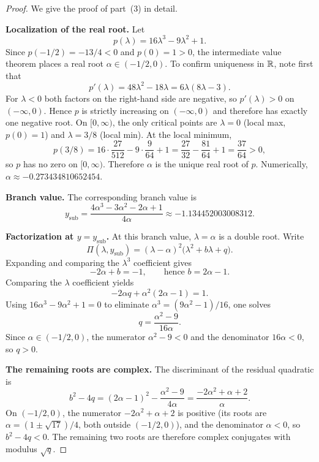 \begin{proof}
We give the proof of part~(3) in detail.

\medskip
\noindent\textbf{Localization of the real root.}
Let
\begin{equation}\label{eq:cubic-lambda}
p(\lambda) = 16\lambda^3 - 9\lambda^2 + 1.
\end{equation}
Since $p(-1/2) = -13/4 < 0$ and $p(0) = 1 > 0$, the intermediate value theorem places a real root $\alpha \in (-1/2, 0)$.
To confirm uniqueness in $\mathbb{R}$, note first that
\[
p'(\lambda) = 48\lambda^2 - 18\lambda = 6\lambda(8\lambda - 3).
\]
For $\lambda < 0$ both factors on the right-hand side are negative, so $p'(\lambda) > 0$ on $(-\infty,0)$.
Hence $p$ is strictly increasing on $(-\infty,0)$ and therefore has exactly one negative root.
On $[0,\infty)$, the only critical points are $\lambda = 0$ (local max, $p(0) = 1$) and $\lambda = 3/8$ (local min).
At the local minimum,
\[
p(3/8) = 16 \cdot \frac{27}{512} - 9 \cdot \frac{9}{64} + 1
= \frac{27}{32} - \frac{81}{64} + 1 = \frac{37}{64} > 0,
\]
so $p$ has no zero on $[0,\infty)$.
Therefore $\alpha$ is the unique real root of $p$.
Numerically, $\alpha \approx -0.273434810652454$.

\medskip
\noindent\textbf{Branch value.}
The corresponding branch value is
\begin{equation}\label{eq:ysub-formula}
y_{\mathrm{sub}} = \frac{4\alpha^3 - 3\alpha^2 - 2\alpha + 1}{4\alpha}
\approx -1.134452003008312.
\end{equation}

\medskip
\noindent\textbf{Factorization at $y = y_{\mathrm{sub}}$.}
At this branch value, $\lambda = \alpha$ is a double root.
Write
\begin{equation}\label{eq:Pi-ysub-factor}
\Pi(\lambda, y_{\mathrm{sub}}) = (\lambda - \alpha)^2 \bigl(\lambda^2 + b\lambda + q\bigr).
\end{equation}
Expanding and comparing the $\lambda^3$ coefficient gives
\[
-2\alpha + b = -1, \qquad \text{hence } b = 2\alpha - 1.
\]
Comparing the $\lambda$ coefficient yields
\[
-2\alpha q + \alpha^2(2\alpha - 1) = 1.
\]
Using $16\alpha^3 - 9\alpha^2 + 1 = 0$ to eliminate $\alpha^3 = (9\alpha^2 - 1)/16$, one solves
\begin{equation}\label{eq:q-formula}
q = \frac{\alpha^2 - 9}{16\alpha}.
\end{equation}
Since $\alpha \in (-1/2, 0)$, the numerator $\alpha^2 - 9 < 0$ and the denominator $16\alpha < 0$, so $q > 0$.

\medskip
\noindent\textbf{The remaining roots are complex.}
The discriminant of the residual quadratic is
\[
b^2 - 4q = (2\alpha - 1)^2 - \frac{\alpha^2 - 9}{4\alpha}
= \frac{-2\alpha^2 + \alpha + 2}{\alpha}.
\]
On $(-1/2, 0)$, the numerator $-2\alpha^2 + \alpha + 2$ is positive (its roots are $\alpha = (1 \pm \sqrt{17})/4$, both outside $(-1/2, 0)$), and the denominator $\alpha < 0$, so $b^2 - 4q < 0$.
The remaining two roots are therefore complex conjugates with modulus $\sqrt{q}$.


\end{proof}
